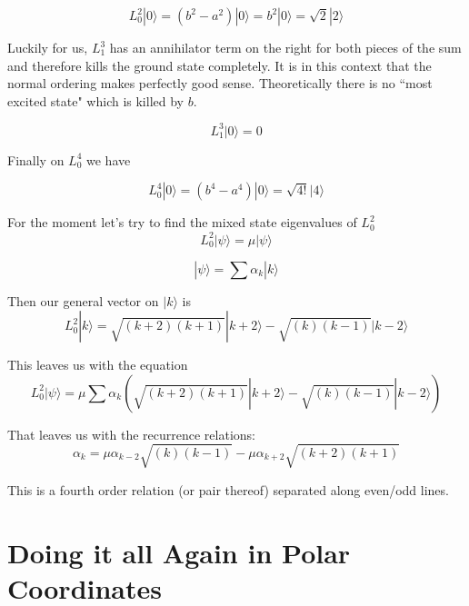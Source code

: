 \documentclass{article}
\newcommand{\ket}[1]{|#1\rangle}
\begin{document}
\[
L_0^2 |0\rangle = (b^2-a^2)|0\rangle = b^2 |0\rangle = \sqrt{2} |2\rangle
\]

Luckily for us, $L_1^3$ has an annihilator term on the right for both pieces of the sum and therefore kills the ground state completely.  It is in this context that the normal ordering makes perfectly good sense.  Theoretically there is no ``most excited state" which is killed by $b$.

\[
L_1^3 |0\rangle = 0
\]

Finally on $L_0^4$ we have

\[
L_0^4 |0\rangle = (b^4 - a^4)|0\rangle = \sqrt{4!}|4\rangle
\]



For the moment let's try to find the mixed state eigenvalues of $L_0^2$
\[
L_0^2 \ket{\psi} = \mu \ket{\psi}
\]

\[
\ket{\psi} = \sum \alpha_k \ket{k}
\]


Then our general vector on $\ket{k}$ is
\[
L_0^2 \ket{k} = \sqrt{(k+2)(k+1)}\ket{k+2} - \sqrt{(k)(k-1)}\ket{k-2}
\]

This leaves us with the equation
\[
L_0^2 \ket{\psi} = \mu \sum \alpha_k (\sqrt{(k+2)(k+1)}\ket{k+2} - \sqrt{(k)(k-1)}\ket{k-2})
\]

That leaves us with the recurrence relations:
\[
\alpha_k = \mu\alpha_{k-2}\sqrt{(k)(k-1)} - \mu\alpha_{k+2}\sqrt{(k+2)(k+1)} 
\]

This is a fourth order relation (or pair thereof) separated along even/odd lines.  

\section*{Doing it all Again in Polar Coordinates}

	
\end{document}
